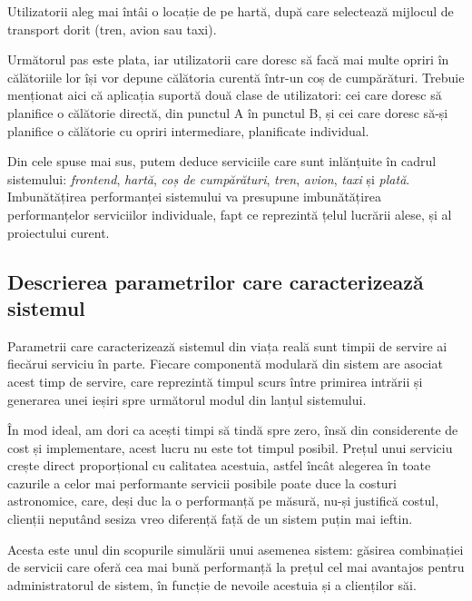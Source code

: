 \documentclass[12pt]{article}
\begin{document}
            Utilizatorii aleg mai întâi o locație de pe hartă, după care selectează mijlocul de transport dorit (tren, avion sau taxi).

            Următorul pas este plata, iar utilizatorii care doresc să facă mai multe opriri în călătoriile lor își vor depune călătoria curentă într-un coș de cum\-pă\-ră\-turi. Trebuie menționat aici că aplicația suportă două clase de utilizatori: cei care doresc să planifice o călătorie directă, din punctul A în punctul B, și cei care doresc să-și planifice o călătorie cu opriri intermediare, planificate individual.

            Din cele spuse mai sus, putem deduce serviciile care sunt inlănțuite în cadrul sistemului: \textit{frontend}, \textit{hartă}, \textit{coș de cumpărături}, \textit{tren}, \textit{avion}, \textit{taxi} și \textit{plată}. Imbunătățirea performanței sistemului va presupune imbunătățirea performanțelor serviciilor individuale, fapt ce reprezintă țelul lucrării alese, și al proiectului curent.
            \pagebreak

        \subsection{Descrierea parametrilor care caracterizează sistemul}
            Parametrii care caracterizează sistemul din viața reală sunt timpii de servire ai fiecărui serviciu în parte. Fiecare componentă modulară din sistem are asociat acest timp de servire, care reprezintă timpul scurs între primirea intrării și generarea unei ieșiri spre următorul modul din lanțul sistemului.

            În mod ideal, am dori ca acești timpi să tindă spre zero, însă din considerente de cost și implementare, acest lucru nu este tot timpul posibil. Prețul unui serviciu crește direct proporțional cu calitatea acestuia, astfel încât alegerea în toate cazurile a celor mai performante servicii posibile poate duce la costuri astronomice, care, deși duc la o performanță pe măsură, nu-și justifică costul, clienții neputând sesiza vreo diferență față de un sistem puțin mai ieftin.

            Acesta este unul din scopurile simulării unui asemenea sistem: găsirea combinației de servicii care oferă cea mai bună performanță la prețul cel mai avantajos pentru administratorul de sistem, în funcție de nevoile acestuia și a clienților săi.
\end{document}
